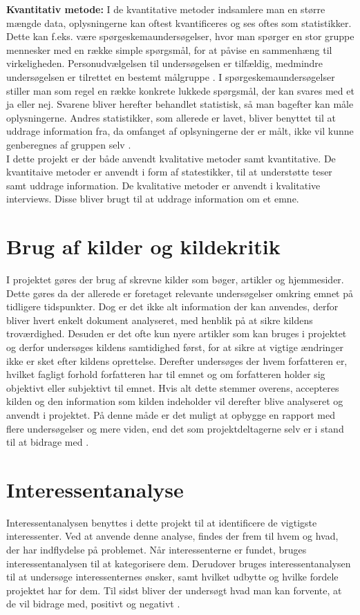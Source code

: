 \noindent\textbf{Kvantitativ metode:}
I de kvantitative metoder indsamlere man en større mængde data, oplysningerne kan oftest kvantificeres og ses oftes som statistikker. Dette kan f.eks. være spørgeskemaundersøgelser, hvor man spørger en stor gruppe mennesker med en række simple spørgsmål, for at påvise en sammenhæng til virkeligheden. Personudvælgelsen til undersøgelsen er tilfældig, medmindre undersøgelsen er tilrettet en bestemt målgruppe \citep{Kvan}. I spørgeskemaundersøgelser stiller man som regel en række konkrete lukkede spørgsmål, der kan svares med et ja eller nej. Svarene bliver herefter behandlet statistisk, så man bagefter kan måle oplysningerne. Andres statistikker, som allerede er lavet, bliver benyttet til at uddrage information fra, da omfanget af oplsyningerne der er målt, ikke vil kunne genberegnes af gruppen selv \citep{Gymportalen}.\\ 

\noindent I dette projekt er der både anvendt kvalitative metoder samt kvantitative. De kvantitaive metoder er anvendt i form af statestikker, til at understøtte teser samt uddrage information. De kvalitative metoder er anvendt i kvalitative interviews. Disse bliver brugt til at uddrage information om et emne.

\section{Brug af kilder og kildekritik}
I projektet gøres der brug af skrevne kilder som bøger, artikler og hjemmesider. Dette gøres da der allerede er foretaget relevante undersøgelser omkring emnet på tidligere tidspunkter. Dog er det ikke alt information der kan anvendes, derfor bliver hvert enkelt dokument analyseret, med henblik på at sikre kildens troværdighed. Desuden er det ofte kun nyere artikler som kan bruges i projektet og derfor undersøges kildens samtidighed først, for at sikre at vigtige ændringer ikke er sket efter kildens oprettelse. Derefter undersøges der hvem forfatteren er, hvilket fagligt forhold forfatteren har til emnet og om forfatteren holder sig objektivt eller subjektivt til emnet. Hvis alt dette stemmer overens, accepteres kilden og den information som kilden indeholder vil derefter blive analyseret og anvendt i projektet. På denne måde er det muligt at opbygge en rapport med flere undersøgelser og mere viden, end det som projektdeltagerne selv er i stand til at bidrage med \citep{Kildekritik}.

\section{Interessentanalyse}
Interessentanalysen benyttes i dette projekt til at identificere de vigtigste interessenter. Ved at anvende denne analyse, findes der frem til hvem og hvad, der har indflydelse på problemet. Når interessenterne er fundet, bruges interessentanalysen til at kategorisere dem. Derudover bruges interessentanalysen til at undersøge interessenternes ønsker, samt hvilket udbytte og hvilke fordele projektet har for dem. Til sidst bliver der undersøgt hvad man kan forvente, at de vil bidrage med, positivt og negativt \citep{MetteLindegaardAttrup2008}.


